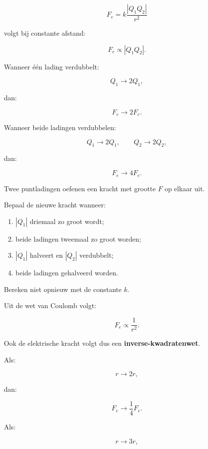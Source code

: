 \documentclass{ximera}
\begin{document}
\[
F_e
=
k\frac{|Q_1Q_2|}{r^2}
\]

volgt bij constante afstand:

\[
\boxed{
F_e\propto |Q_1Q_2|.
}
\]

Wanneer één lading verdubbelt:

\[
Q_1\rightarrow2Q_1,
\]

dan:

\[
F_e\rightarrow2F_e.
\]

Wanneer beide ladingen verdubbelen:

\[
Q_1\rightarrow2Q_1,
\qquad
Q_2\rightarrow2Q_2,
\]

dan:

\[
F_e\rightarrow4F_e.
\]


\begin{oefening}{\oefB\ESS}

Twee puntladingen oefenen een kracht met grootte $F$ op elkaar uit.

Bepaal de nieuwe kracht wanneer:

\begin{enumerate}
  \item $|Q_1|$ driemaal zo groot wordt;
  \item beide ladingen tweemaal zo groot worden;
  \item $|Q_1|$ halveert en $|Q_2|$ verdubbelt;
  \item beide ladingen gehalveerd worden.
\end{enumerate}

Bereken niet opnieuw met de constante $k$.

\end{oefening}




Uit de wet van Coulomb volgt:

\[
\boxed{
F_e\propto\frac{1}{r^2}.
}
\]

Ook de elektrische kracht volgt dus een
\textbf{inverse-kwadratenwet}.

Als:

\[
r\rightarrow2r,
\]

dan:

\[
F_e\rightarrow\frac14F_e.
\]

Als:

\[
r\rightarrow3r,
\]
\end{document}
